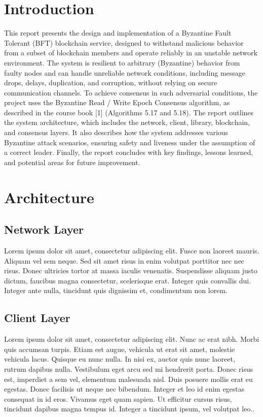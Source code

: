 \documentclass[runningheads]{llncs}
\begin{document}
\section{Introduction}
This report presents the design and implementation of a Byzantine Fault Tolerant (BFT) blockchain service, designed to withstand malicious behavior from a subset of blockchain members and operate reliably in an unstable network environment. The system is resilient to arbitrary (Byzantine) behavior from faulty nodes and can handle unreliable network conditions, including message drops, delays, duplication, and corruption, without relying on secure communication channels. To achieve consensus in such adversarial conditions, the project uses the Byzantine Read / Write Epoch Consensus algorithm, as described in the course book [1] (Algorithms 5.17 and 5.18).
The report outlines the system architecture, which includes the network, client, library, blockchain, and consensus layers. It also describes how the system addresses various Byzantine attack scenarios, ensuring safety and liveness under the assumption of a correct leader. Finally, the report concludes with key findings, lessons learned, and potential areas for future improvement.
%
\section{Architecture}
\subsection{Network Layer}
Lorem ipsum dolor sit amet, consectetur adipiscing elit. Fusce non laoreet mauris. Aliquam vel sem neque. Sed sit amet risus in enim volutpat porttitor nec nec risus. Donec ultricies tortor at massa iaculis venenatis. Suspendisse aliquam justo dictum, faucibus magna consectetur, scelerisque erat. Integer quis convallis dui. Integer ante nulla, tincidunt quis dignissim et, condimentum non lorem.
%
\subsection{Client Layer}
Lorem ipsum dolor sit amet, consectetur adipiscing elit. Nunc ac erat nibh. Morbi quis accumsan turpis. Etiam est augue, vehicula ut erat sit amet, molestie vehicula lacus. Quisque eu nunc nulla. In nisi ex, auctor quis nunc laoreet, rutrum dapibus nulla. Vestibulum eget arcu sed mi hendrerit porta. Donec risus est, imperdiet a sem vel, elementum malesuada nisl. Duis posuere mollis erat eu egestas. Donec facilisis ut neque nec bibendum. Integer et leo id enim egestas consequat in id eros. Vivamus eget quam sapien. Ut efficitur cursus risus, tincidunt dapibus magna tempus id. Integer a tincidunt ipsum, vel volutpat leo..
%
\end{document}

